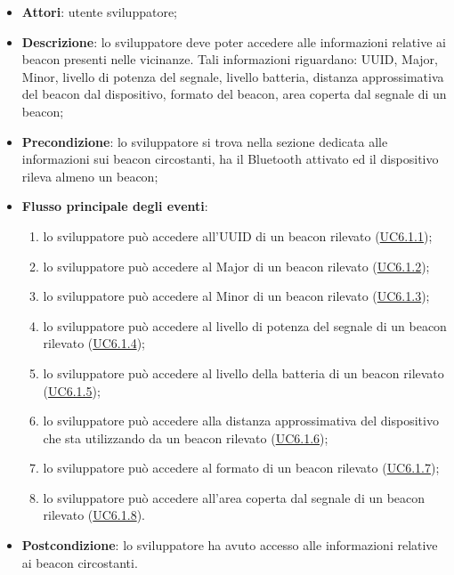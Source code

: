 \documentclass[../AnalisiDeiRequisiti.tex]{subfiles}
\begin{document}
\begin{itemize}
	\item \textbf{Attori}: utente sviluppatore;
	\item \textbf{Descrizione}: lo sviluppatore deve poter accedere alle informazioni relative ai beacon presenti nelle vicinanze. Tali informazioni riguardano: UUID, Major, Minor, livello di potenza del segnale, livello batteria, distanza approssimativa del beacon dal dispositivo, formato del beacon, area coperta dal segnale di un beacon; 
	\item \textbf{Precondizione}: lo sviluppatore si trova nella sezione dedicata alle informazioni sui beacon circostanti, ha il Bluetooth attivato ed il dispositivo rileva almeno un beacon;
	
	\item \textbf{Flusso principale degli eventi}:
	\begin{enumerate}
		\item lo sviluppatore può accedere all'UUID di un beacon rilevato (\hyperlink{UC6.1.1}{UC6.1.1});
		\item lo sviluppatore può accedere al Major di un beacon rilevato (\hyperlink{UC6.1.2}{UC6.1.2});
		\item lo sviluppatore può accedere al Minor di un beacon rilevato (\hyperlink{UC6.1.3}{UC6.1.3});
		\item lo sviluppatore può accedere al livello di potenza del segnale di un beacon rilevato (\hyperlink{UC6.1.4}{UC6.1.4});
		\item lo sviluppatore può accedere al livello della batteria di un beacon rilevato (\hyperlink{UC6.1.5}{UC6.1.5});
		\item lo sviluppatore può accedere alla distanza approssimativa del dispositivo che sta utilizzando da un beacon rilevato (\hyperlink{UC6.1.6}{UC6.1.6});
		\item lo sviluppatore può accedere al formato di un beacon rilevato (\hyperlink{UC6.1.7}{UC6.1.7});
		\item lo sviluppatore può accedere all'area coperta dal segnale di un beacon rilevato (\hyperlink{UC6.1.8}{UC6.1.8}).
		
	\end{enumerate}
	\item \textbf{Postcondizione}: lo sviluppatore ha avuto accesso alle informazioni relative ai beacon circostanti.
\end{itemize}
\hypertarget{UC6.1.1}{}
\end{document}
